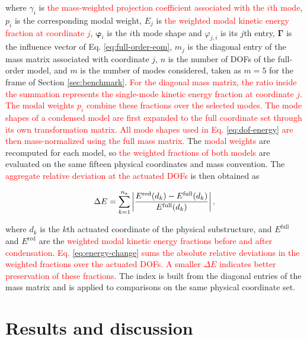 \documentclass[a4paper,fleqn,review,12pt]{cas-sc}
\newcommand{\rev}[1]{\textcolor{red}{#1}}
\begin{document}
\noindent where \(\gamma_{i}\) is \rev{the mass-weighted projection coefficient associated with the \(i\)th mode}, \(p_{i}\) is the corresponding modal weight, \(E_{j}\) is \rev{the weighted modal kinetic energy fraction at coordinate \(j\)}, \(\bm{\varphi}_{i}\) is the \(i\)th mode shape and \(\varphi_{j,i}\) is its \(j\)th entry, \(\bm{\Gamma}\) is the influence vector of Eq. \eqref{eq:full-order-eom}, \(m_{j}\) is the diagonal entry of the mass matrix associated with coordinate \(j\), \(n\) is the number of DOFs of the full-order model, and \(m\) is the number of modes considered, taken as \(m=5\) for the frame of Section \ref{sec:benchmark}. \rev{For the diagonal mass matrix, the ratio inside the summation represents the single-mode kinetic energy fraction at coordinate \(j\). The modal weights \(p_i\) combine these fractions over the selected modes.} \rev{The mode shapes of a condensed model are first expanded to the full coordinate set through its own transformation matrix. All mode shapes used in Eq. \eqref{eq:dof-energy} are then mass-normalized using the full mass matrix.} The \rev{modal weights} are recomputed for each model, so \rev{the weighted fractions of both models} are evaluated on the same fifteen physical coordinates and mass convention. The \rev{aggregate relative deviation at the actuated DOFs} is then obtained as

\vspace{-3.5em}
\begin{equation}
	\Delta E=\sum_{k=1}^{n_{\mathrm{a}}}
	\left|\frac{E^{\mathrm{red}}(d_{k})-E^{\mathrm{full}}(d_{k})}{E^{\mathrm{full}}(d_{k})}\right|\rev{,}
	\label{eq:energy-change}
\end{equation}
\vspace{-3.5em}

\noindent where \(d_{k}\) is the \(k\)th actuated coordinate of the physical substructure, and \(E^{\mathrm{full}}\) and \(E^{\mathrm{red}}\) are the \rev{weighted modal kinetic energy fractions before and after condensation}. \rev{Eq. \eqref{eq:energy-change} sums the absolute relative deviations in the weighted fractions over the actuated DOFs. A smaller \(\Delta E\) indicates better preservation of these fractions.} The index is built from the diagonal entries of the mass matrix and is applied to comparisons on the same physical coordinate set.




\section{Results and discussion} \label{sec5}
\end{document}
